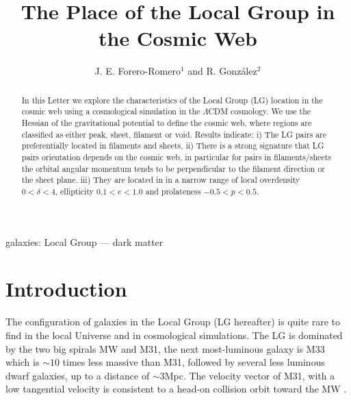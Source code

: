 \documentclass{emulateapj}
\newcommand{\mpc}{\rm{Mpc}}
\begin{document}
\title{The Place of the Local Group in the Cosmic Web}
\author{J. E. Forero-Romero$^1$ and R. Gonz\'alez$^2$}


\begin{abstract}
In this Letter we explore the characteristics of the Local Group (LG)
location in the cosmic web using a cosmological simulation in the
$\Lambda$CDM cosmology.
We use the Hessian of the gravitational potential to define the cosmic web, 
where regions are classified as either peak, sheet, filament or void.
Results indicate: 
i) The LG pairs are preferentially located in filaments and sheets,
ii) There is a strong signature that LG pairs orientation depends on the cosmic web, 
in particular for pairs in filaments/sheets the orbital angular momentum tends to be perpendicular to the filament direction or the sheet plane.
iii) They are located in in a narrow range of local overdensity $0<\delta<4$, 
ellipticity $0.1<e<1.0$ and prolateness $-0.5<p<0.5$. 
\end{abstract}

\begin{keywords}
{galaxies: Local Group --- dark matter}
\end{keywords}


\section{Introduction}
\label{sec:intro}

The configuration of galaxies in the Local Group (LG hereafter) is
quite rare to find in the local Universe and in cosmological
simulations. The LG is dominated by the two big spirals MW and M31, the next
most-luminous galaxy is M33 which is $\sim 10$ times less massive than
M31, followed by several less luminous dwarf galaxies, up to a
distance of $\sim 3$\mpc.   The velocity vector of M31, with a low
tangential velocity is consistent to a head-on collision orbit toward
the MW
\citep{2008MNRAS.386..461C,2012ApJ...753....8V,2012ApJ...753....7S}.   
\end{document}
